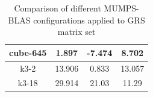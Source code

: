 \begin{table}[h!]
\begin{tabular}{|c|c|c|c|}
cube-645                                              & 1.897                                                                                                   & -7.474                                                                                               & 8.702                                                                                                   \\ \hline
k3-2                                                  & 13.906                                                                                                  & 0.833                                                                                                & 13.057                                                                                                  \\ \hline
k3-18                                                 & 29.914                                                                                                  & 21.03                                                                                                & 11.29                                                                                                   \\ \hline
\end{tabular}
\caption{Comparison of different MUMPS-BLAS configurations applied to GRS matrix set}
\label{table:mumps-blas-performance-gain-grs}
\end{table}



